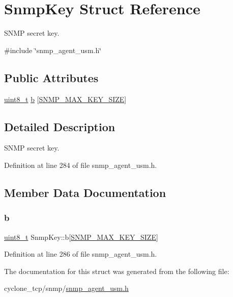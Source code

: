 \hypertarget{structSnmpKey}{}\section{Snmp\+Key Struct Reference}
\label{structSnmpKey}


S\+N\+MP secret key.  




{\ttfamily \#include \char`\"{}snmp\+\_\+agent\+\_\+usm.\+h\char`\"{}}

\subsection*{Public Attributes}
\begin{DoxyCompactItemize}
\item 
\hyperlink{stdint_8h_aba7bc1797add20fe3efdf37ced1182c5}{uint8\+\_\+t} \hyperlink{structSnmpKey_a5c25e9b803c40ded2a7ee670557954a0}{b} \mbox{[}\hyperlink{snmp__agent__usm_8h_a197fe5f83e459aaf54057f2a4fdb496d}{S\+N\+M\+P\+\_\+\+M\+A\+X\+\_\+\+K\+E\+Y\+\_\+\+S\+I\+ZE}\mbox{]}
\end{DoxyCompactItemize}


\subsection{Detailed Description}
S\+N\+MP secret key. 

Definition at line 284 of file snmp\+\_\+agent\+\_\+usm.\+h.



\subsection{Member Data Documentation}
\mbox{\label{structSnmpKey_a5c25e9b803c40ded2a7ee670557954a0}} 
\subsubsection{\texorpdfstring{b}{b}}
{\footnotesize\ttfamily \hyperlink{stdint_8h_aba7bc1797add20fe3efdf37ced1182c5}{uint8\+\_\+t} Snmp\+Key\+::b\mbox{[}\hyperlink{snmp__agent__usm_8h_a197fe5f83e459aaf54057f2a4fdb496d}{S\+N\+M\+P\+\_\+\+M\+A\+X\+\_\+\+K\+E\+Y\+\_\+\+S\+I\+ZE}\mbox{]}}



Definition at line 286 of file snmp\+\_\+agent\+\_\+usm.\+h.



The documentation for this struct was generated from the following file\+:\begin{DoxyCompactItemize}
\item 
cyclone\+\_\+tcp/snmp/\hyperlink{snmp__agent__usm_8h}{snmp\+\_\+agent\+\_\+usm.\+h}\end{DoxyCompactItemize}
